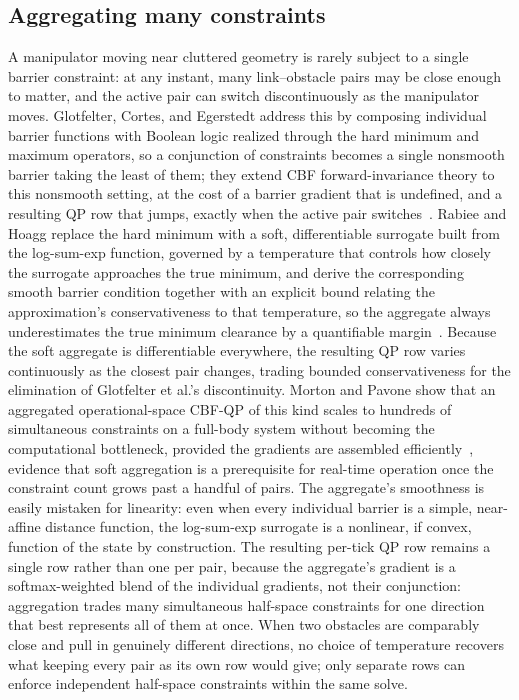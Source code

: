 \documentclass[12pt,a4paper,twoside,openright]{report}
\begin{document}
\subsection{Aggregating many constraints}
\label{sec:sota-aggregation}

A manipulator moving near cluttered geometry is rarely subject to a single barrier constraint: at any instant, many link--obstacle pairs may be close enough to matter, and the active pair can switch discontinuously as the manipulator moves. Glotfelter, Cortes, and Egerstedt address this by composing individual barrier functions with Boolean logic realized through the hard minimum and maximum operators, so a conjunction of constraints becomes a single nonsmooth barrier taking the least of them; they extend CBF forward-invariance theory to this nonsmooth setting, at the cost of a barrier gradient that is undefined, and a resulting QP row that jumps, exactly when the active pair switches~\cite{glotfelter2017}. Rabiee and Hoagg replace the hard minimum with a soft, differentiable surrogate built from the log-sum-exp function, governed by a temperature that controls how closely the surrogate approaches the true minimum, and derive the corresponding smooth barrier condition together with an explicit bound relating the approximation's conservativeness to that temperature, so the aggregate always underestimates the true minimum clearance by a quantifiable margin~\cite{rabiee2025softmin}. Because the soft aggregate is differentiable everywhere, the resulting QP row varies continuously as the closest pair changes, trading bounded conservativeness for the elimination of Glotfelter et al.'s discontinuity. Morton and Pavone show that an aggregated operational-space CBF-QP of this kind scales to hundreds of simultaneous constraints on a full-body system without becoming the computational bottleneck, provided the gradients are assembled efficiently~\cite{morton2025oscbf}, evidence that soft aggregation is a prerequisite for real-time operation once the constraint count grows past a handful of pairs. The aggregate's smoothness is easily mistaken for linearity: even when every individual barrier is a simple, near-affine distance function, the log-sum-exp surrogate is a nonlinear, if convex, function of the state by construction. The resulting per-tick QP row remains a single row rather than one per pair, because the aggregate's gradient is a softmax-weighted blend of the individual gradients, not their conjunction: aggregation trades many simultaneous half-space constraints for one direction that best represents all of them at once. When two obstacles are comparably close and pull in genuinely different directions, no choice of temperature recovers what keeping every pair as its own row would give; only separate rows can enforce independent half-space constraints within the same solve.
\end{document}
